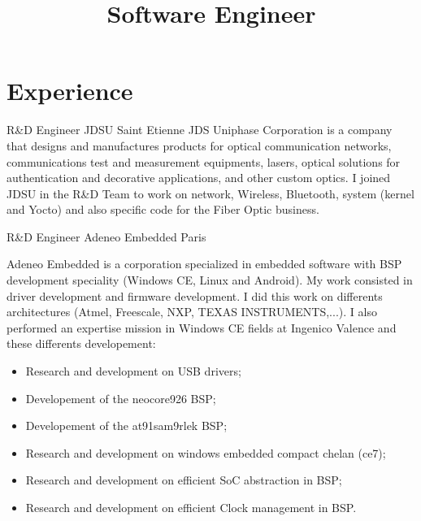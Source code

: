 \documentclass[11pt,a4paper,sans]{moderncv}
\title{Software Engineer}
\begin{document}
\makecvtitle

\section{Experience}

{R\&D Engineer}
{JDSU}
{Saint Etienne}
{}
{JDS Uniphase Corporation is a company that designs and manufactures products
for optical communication networks, communications test and measurement
equipments, lasers, optical solutions for authentication and decorative
applications, and other custom optics.
I joined JDSU in the R\&D Team to work on network, Wireless, Bluetooth,
system (kernel and Yocto) and also specific code for the Fiber Optic
business.}

{R\&D Engineer}
{Adeneo Embedded}
{Paris}
{}
{Adeneo Embedded is a corporation specialized in embedded software with BSP
development speciality (Windows CE, Linux and Android).
My work consisted in driver development and firmware development. 
I did this work on differents architectures (Atmel, Freescale,
NXP, TEXAS INSTRUMENTS,...).
I also performed an expertise mission in Windows CE fields at Ingenico
Valence and these differents developement:
\begin{itemize}
\item Research and development on USB drivers;
\item Developement of the neocore926 BSP;
\item Developement of the at91sam9rlek BSP;
\item Research and development on windows embedded compact chelan (ce7);
\item Research and development on efficient SoC abstraction in BSP;
\item Research and development on efficient Clock management in BSP.
\end{itemize}
}
\end{document}
